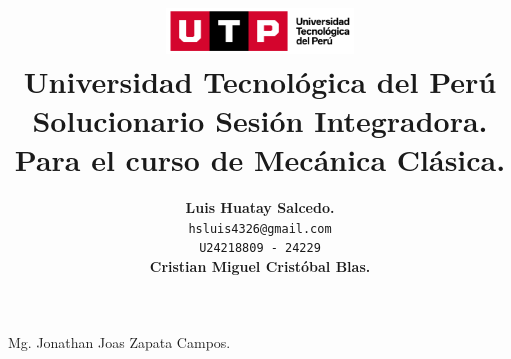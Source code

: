 \documentclass{article}
\title{
  \includegraphics[width=5cm]{./assets/logo-utp.png} \\
  \vspace{1cm}
  \textbf{Universidad Tecnológica del Perú} \\
  \vspace{2cm}
  \textbf{Solucionario Sesión Integradora.} \\
  \vspace{1cm}
  \large \textbf{Para el curso de Mecánica Clásica.}
}
\author{
  \textbf{Luis Huatay Salcedo.} \\
  \texttt{hsluis4326@gmail.com} \\
  \texttt{U24218809 - 24229} \\
  \textbf{Cristian Miguel Cristóbal Blas.} \\
}
\begin{document}
\maketitle
\thispagestyle{empty}
\begin{center}
  Mg. Jonathan Joas Zapata Campos.  
\end{center}
\restoregeometry

\newpage




\end{document}

